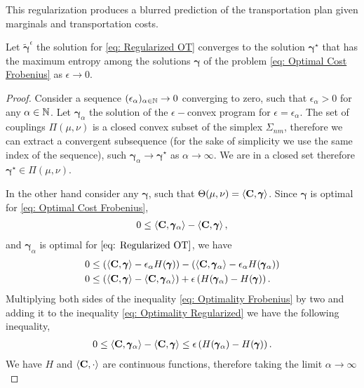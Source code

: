 This regularization produces a blurred prediction of the transportation plan given marginals and transportation costs.
\begin{theorem}
	Let $\tilde{\pmb{\gamma}}^{\epsilon}$ the solution for \eqref{eq: Regularized OT} converges to the solution $\pmb{\gamma}^\star$ that has the maximum entropy among the solutions $\pmb{\gamma}$ of the problem \eqref{eq: Optimal Cost Frobenius}  as $\epsilon\rightarrow 0$.
\end{theorem}
\begin{proof}
	Consider a sequence $(\epsilon_\alpha)_{\alpha\in\mathbb{N}} \to 0$ converging to zero, such that $\epsilon_\alpha>0$ for any $\alpha\in\mathbb{N}$. Let $\pmb{\gamma}_\alpha$ the solution of the $\epsilon-$convex program for $\epsilon=\epsilon_\alpha$. The set of couplings $\Pi(\mu,\nu)$ is a closed convex subset of the simplex $\Sigma_{nm}$, therefore we can extract a convergent subsequence (for the sake of simplicity we use the same index of the sequence), such  $\pmb{\gamma}_{\alpha}\rightarrow \pmb{\gamma}^\star$ as $\alpha\rightarrow \infty$.  We are in a closed set therefore $\pmb{\gamma}^\star\in \Pi(\mu,\nu)$. 
	
	In the other hand consider any $\pmb{\gamma}$, such that $\Theta(\mu, \nu)=\left\langle \mathbf{C},\pmb{\gamma} \right\rangle$. Since $\pmb{\gamma}$ is optimal for \eqref{eq: Optimal Cost Frobenius},
	\begin{align}
	0\leq \left\langle \mathbf{C},\pmb{\gamma}_\alpha \right\rangle-\left\langle \mathbf{C},\pmb{\gamma} \right\rangle \label{eq: Optimality Frobenius},
	\end{align}
	and $\pmb{\gamma}_\alpha$ is optimal for $\eqref{eq: Regularized OT}$, we have
	\begin{align}
		0&\leq \left( \left\langle \mathbf{C},\pmb{\gamma} \right\rangle-\epsilon_\alpha H(\pmb{\gamma}) \right)-\left( \left\langle \mathbf{C},\pmb{\gamma}_\alpha \right\rangle-\epsilon_\alpha H(\pmb{\gamma}_\alpha) \right)\\
		0&\leq \left( \left\langle \mathbf{C},\pmb{\gamma} \right\rangle-\left\langle \mathbf{C},\pmb{\gamma}_\alpha \right\rangle \right)+\epsilon\left(  H(\pmb{\gamma}_\alpha)- H(\pmb{\gamma}) \right) \label{eq: Optimality Regularized}.
	\end{align}
	Multiplying both sides of the inequality \eqref{eq: Optimality Frobenius} by two and adding it to the inequality \eqref{eq: Optimality Regularized} we have the following inequality,
	\begin{align}
		0\leq \left\langle \mathbf{C},\pmb{\gamma}_\alpha \right\rangle-\left\langle \mathbf{C},\pmb{\gamma} \right\rangle\leq \epsilon\left( H(\pmb{\gamma}_\alpha)-H(\pmb{\gamma}) \right).
	\end{align}
	We have $H$ and $\left\langle \mathbf{C}, \cdot \right\rangle$ are continuous functions, therefore taking the limit $\alpha\rightarrow \infty$  
	\end{proof}
